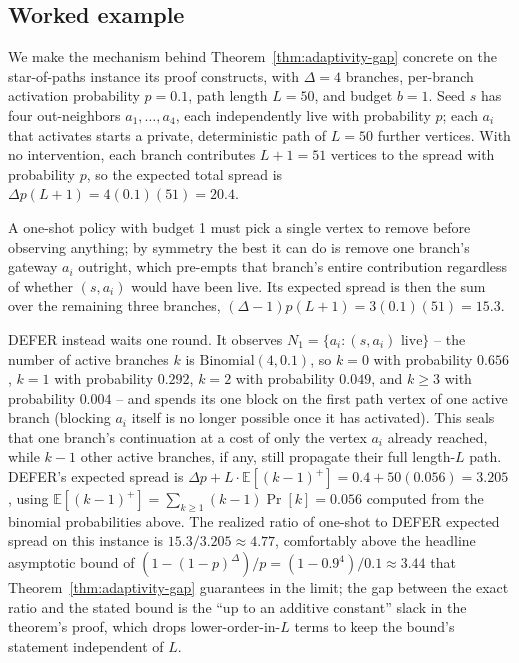 \documentclass[ijoc,sglanonrev]{informs4}
\begin{document}
\subsection{Worked example}\label{sec:defer-example}

We make the mechanism behind Theorem~\ref{thm:adaptivity-gap} concrete on
the star-of-paths instance its proof constructs, with $\Delta=4$ branches,
per-branch activation probability $p=0.1$, path length $L=50$, and budget
$b=1$. Seed $s$ has four out-neighbors $a_1,\dots,a_4$, each independently
live with probability $p$; each $a_i$ that activates starts a private,
deterministic path of $L=50$ further vertices. With no intervention, each
branch contributes $L+1=51$ vertices to the spread with probability $p$,
so the expected total spread is $\Delta p(L+1)=4(0.1)(51)=20.4$.

A one-shot policy with budget 1 must pick a single vertex to remove before
observing anything; by symmetry the best it can do is remove one branch's
gateway $a_i$ outright, which pre-empts that branch's entire contribution
regardless of whether $(s,a_i)$ would have been live. Its expected spread
is then the sum over the remaining three branches,
$(\Delta-1)p(L+1)=3(0.1)(51)=15.3$.

DEFER instead waits one round. It observes $N_1=\{a_i:(s,a_i)\text{ live}\}$
-- the number of active branches $k$ is $\mathrm{Binomial}(4,0.1)$, so
$k=0$ with probability $0.656$, $k=1$ with probability $0.292$, $k=2$ with
probability $0.049$, and $k\ge3$ with probability $0.004$ -- and spends its
one block on the first path vertex of one active branch (blocking $a_i$
itself is no longer possible once it has activated). This seals that one
branch's continuation at a cost of only the vertex $a_i$ already reached,
while $k-1$ other active branches, if any, still propagate their full
length-$L$ path. DEFER's expected spread is
$\Delta p+L\cdot\mathbb E[(k-1)^+]=0.4+50(0.056)=3.205$, using
$\mathbb E[(k-1)^+]=\sum_{k\ge1}(k-1)\Pr[k]=0.056$ computed from the
binomial probabilities above. The realized ratio of one-shot to DEFER
expected spread on this instance is $15.3/3.205\approx4.77$, comfortably
above the headline asymptotic bound of
$(1-(1-p)^\Delta)/p=(1-0.9^4)/0.1\approx3.44$ that
Theorem~\ref{thm:adaptivity-gap} guarantees in the limit; the gap between
the exact ratio and the stated bound is the ``up to an additive constant''
slack in the theorem's proof, which drops lower-order-in-$L$ terms to keep
the bound's statement independent of $L$.
\end{document}
